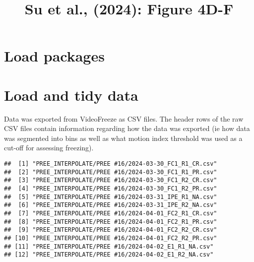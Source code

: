 \documentclass[
]{article}
\title{Su et al., (2024): Figure 4D-F}
\author{}
\date{\vspace{-2.5em}}
\newenvironment{Shaded}{\begin{snugshade}}{\end{snugshade}}
\newcommand{\AttributeTok}[1]{\textcolor[rgb]{0.13,0.29,0.53}{#1}}
\newcommand{\CommentTok}[1]{\textcolor[rgb]{0.56,0.35,0.01}{\textit{#1}}}
\newcommand{\ConstantTok}[1]{\textcolor[rgb]{0.56,0.35,0.01}{#1}}
\newcommand{\FunctionTok}[1]{\textcolor[rgb]{0.13,0.29,0.53}{\textbf{#1}}}
\newcommand{\NormalTok}[1]{#1}
\newcommand{\StringTok}[1]{\textcolor[rgb]{0.31,0.60,0.02}{#1}}
\begin{document}
\maketitle

\hypertarget{load-packages}{%
\section{Load packages}\label{load-packages}}

\hypertarget{load-and-tidy-data}{%
\section{Load and tidy data}\label{load-and-tidy-data}}

Data was exported from VideoFreeze as CSV files. The header rows of the
raw CSV files contain information regarding how the data was exported
(ie how data was segmented into bins as well as what motion index
threshold was used as a cut-off for assessing freezing).

\begin{Shaded}
\end{Shaded}

\begin{verbatim}
##  [1] "PREE_INTERPOLATE/PREE #16/2024-03-30_FC1_R1_CR.csv"
##  [2] "PREE_INTERPOLATE/PREE #16/2024-03-30_FC1_R1_PR.csv"
##  [3] "PREE_INTERPOLATE/PREE #16/2024-03-30_FC1_R2_CR.csv"
##  [4] "PREE_INTERPOLATE/PREE #16/2024-03-30_FC1_R2_PR.csv"
##  [5] "PREE_INTERPOLATE/PREE #16/2024-03-31_IPE_R1_NA.csv"
##  [6] "PREE_INTERPOLATE/PREE #16/2024-03-31_IPE_R2_NA.csv"
##  [7] "PREE_INTERPOLATE/PREE #16/2024-04-01_FC2_R1_CR.csv"
##  [8] "PREE_INTERPOLATE/PREE #16/2024-04-01_FC2_R1_PR.csv"
##  [9] "PREE_INTERPOLATE/PREE #16/2024-04-01_FC2_R2_CR.csv"
## [10] "PREE_INTERPOLATE/PREE #16/2024-04-01_FC2_R2_PR.csv"
## [11] "PREE_INTERPOLATE/PREE #16/2024-04-02_E1_R1_NA.csv" 
## [12] "PREE_INTERPOLATE/PREE #16/2024-04-02_E1_R2_NA.csv"
\end{verbatim}
\end{document}
